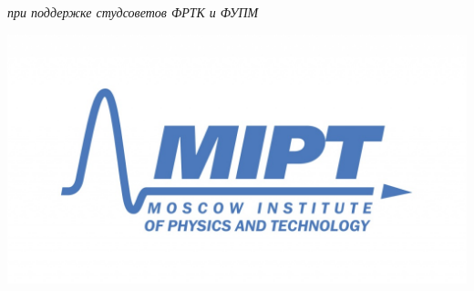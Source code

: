 \begin{titlepage}
\begin{bottompar}
\begin{flushright}
\textit{при поддержке студсоветов ФРТК и ФУПМ}\\

\end{flushright}


\begin{center}	
	\includegraphics[width = 80 mm]{logo.jpg}
	
\end{center}
\end{bottompar}
\end{titlepage}

